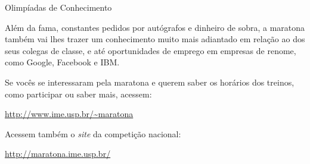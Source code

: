 \begin{subsecao}{Olimpíadas de Conhecimento}
\begin{itemize}
Além da fama, constantes pedidos por autógrafos e dinheiro de sobra,
a maratona também vai lhes trazer um conhecimento muito mais
adiantado em relação ao dos seus colegas de classe, e até oportunidades
de emprego em empresas de renome, como Google, Facebook e IBM.

Se vocês se interessaram pela maratona e querem saber os horários dos
treinos, como participar ou saber mais, acessem:

\url{http://www.ime.usp.br/~maratona}

Acessem também o \textit{site} da competição nacional:

\url{http://maratona.ime.usp.br/}

\end{itemize}


\end{subsecao}
